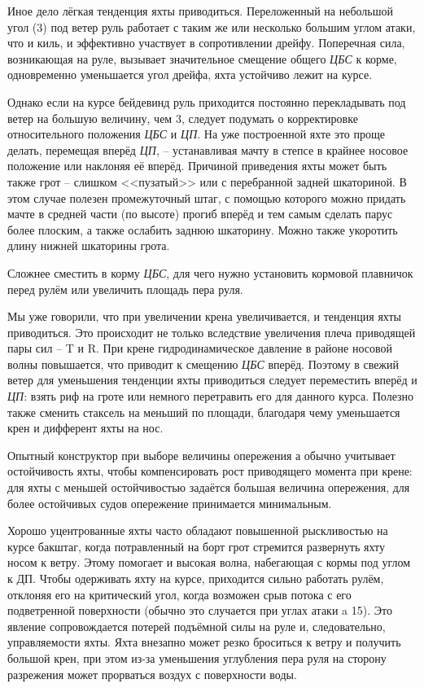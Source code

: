 Иное дело лёгкая тенденция яхты приводиться. Переложенный на небольшой
угол (3\gr) под ветер руль работает с таким же или несколько
большим углом атаки, что и киль, и эффективно участвует в
сопротивлении дрейфу. Поперечная сила, возникающая на руле, вызывает
значительное смещение общего \textit{ЦБС} к корме, одновременно
уменьшается угол дрейфа, яхта устойчиво лежит на курсе.

Однако если на курсе бейдевинд руль приходится постоянно перекладывать
под ветер на большую величину, чем 3\gr, следует подумать о
корректировке относительного положения \textit{ЦБС} и \textit{ЦП}. На
уже построенной яхте это проще делать, перемещая вперёд \textit{ЦП},
\--- устанавливая мачту в степсе в крайнее носовое положение или
наклоняя её вперёд. Причиной приведения яхты может быть также грот
\--- слишком <<пузатый>> или с перебранной задней шкаториной. В этом
случае полезен промежуточный штаг, с помощью которого можно придать
мачте в средней части (по высоте) прогиб вперёд и тем самым сделать
парус более плоским, а также ослабить заднюю шкаторину. Можно также
укоротить длину нижней шкаторины грота.

Сложнее сместить в корму \textit{ЦБС}, для чего нужно установить
кормовой плавничок перед рулём или увеличить площадь пера руля.

Мы уже говорили, что при увеличении крена увеличивается, и тенденция
яхты приводиться. Это происходит не только вследствие увеличения плеча
приводящей пары сил \--- \ve T и \ve R. При крене гидродинамическое
давление в районе носовой волны повышается, что приводит к смещению
\textit{ЦБС} вперёд. Поэтому в свежий ветер для уменьшения тенденции
яхты приводиться следует переместить вперёд и \textit{ЦП}: взять риф
на гроте или немного перетравить его для данного курса. Полезно также
сменить стаксель на меньший по площади, благодаря чему уменьшается
крен и дифферент яхты на нос.

Опытный конструктор при выборе величины опережения а обычно учитывает
остойчивость яхты, чтобы компенсировать рост приводящего момента при
крене: для яхты с меньшей остойчивостью задаётся большая величина
опережения, для более остойчивых судов опережение принимается
минимальным.

Хорошо уцентрованные яхты часто обладают повышенной рыскливостью на
курсе бакштаг, когда потравленный на борт грот стремится развернуть
яхту носом к ветру. Этому помогает и высокая волна, набегающая с кормы
под углом к ДП. Чтобы одерживать яхту на курсе, приходится сильно
работать рулём, отклоняя его на критический угол, когда возможен срыв
потока с его подветренной поверхности (обычно это случается при углах
атаки a 15\gr). Это явление сопровождается потерей подъёмной
силы на руле и, следовательно, управляемости яхты. Яхта внезапно может
резко броситься к ветру и получить большой крен, при этом из-за
уменьшения углубления пера руля на сторону разрежения может прорваться
воздух с поверхности воды.

